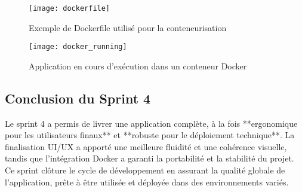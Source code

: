 \begin{figure}[H]
    \centering
    \texttt{[image: dockerfile]}
    \caption{Exemple de Dockerfile utilisé pour la conteneurisation}
    
    \centering
    \texttt{[image: docker\_running]}
    \caption{Application en cours d’exécution dans un conteneur Docker}
\end{figure}

\subsection*{Conclusion du Sprint 4}

Le sprint 4 a permis de livrer une application complète, 
à la fois **ergonomique pour les utilisateurs finaux** et **robuste pour le déploiement technique**.  
La finalisation UI/UX a apporté une meilleure fluidité et une cohérence visuelle, 
tandis que l’intégration Docker a garanti la portabilité et la stabilité du projet.  
Ce sprint clôture le cycle de développement en assurant la qualité globale de l’application, 
prête à être utilisée et déployée dans des environnements variés.
